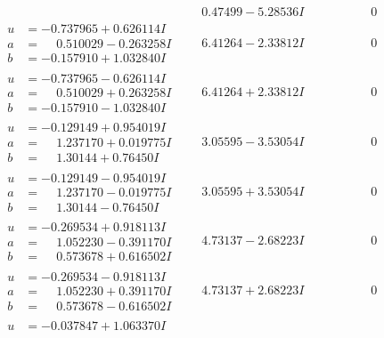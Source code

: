 \documentclass[1p]{elsarticle_modified}
\theoremstyle{definition}
\begin{document}
$$\begin{array}{c|c|c}
 & \phantom{-}0.47499 - 5.28536 I & \phantom{-0.000000 } 0 \\ \hline\begin{aligned}
u &= -0.737965 + 0.626114 I \\
a &= \phantom{-}0.510029 - 0.263258 I \\
b &= -0.157910 + 1.032840 I\end{aligned}
 & \phantom{-}6.41264 - 2.33812 I & \phantom{-0.000000 } 0 \\ \hline\begin{aligned}
u &= -0.737965 - 0.626114 I \\
a &= \phantom{-}0.510029 + 0.263258 I \\
b &= -0.157910 - 1.032840 I\end{aligned}
 & \phantom{-}6.41264 + 2.33812 I & \phantom{-0.000000 } 0 \\ \hline\begin{aligned}
u &= -0.129149 + 0.954019 I \\
a &= \phantom{-}1.237170 + 0.019775 I \\
b &= \phantom{-}1.30144 + 0.76450 I\end{aligned}
 & \phantom{-}3.05595 - 3.53054 I & \phantom{-0.000000 } 0 \\ \hline\begin{aligned}
u &= -0.129149 - 0.954019 I \\
a &= \phantom{-}1.237170 - 0.019775 I \\
b &= \phantom{-}1.30144 - 0.76450 I\end{aligned}
 & \phantom{-}3.05595 + 3.53054 I & \phantom{-0.000000 } 0 \\ \hline\begin{aligned}
u &= -0.269534 + 0.918113 I \\
a &= \phantom{-}1.052230 - 0.391170 I \\
b &= \phantom{-}0.573678 + 0.616502 I\end{aligned}
 & \phantom{-}4.73137 - 2.68223 I & \phantom{-0.000000 } 0 \\ \hline\begin{aligned}
u &= -0.269534 - 0.918113 I \\
a &= \phantom{-}1.052230 + 0.391170 I \\
b &= \phantom{-}0.573678 - 0.616502 I\end{aligned}
 & \phantom{-}4.73137 + 2.68223 I & \phantom{-0.000000 } 0 \\ \hline\begin{aligned}
u &= -0.037847 + 1.063370 I \\

\end{aligned}
\end{array}$$
\end{document}
